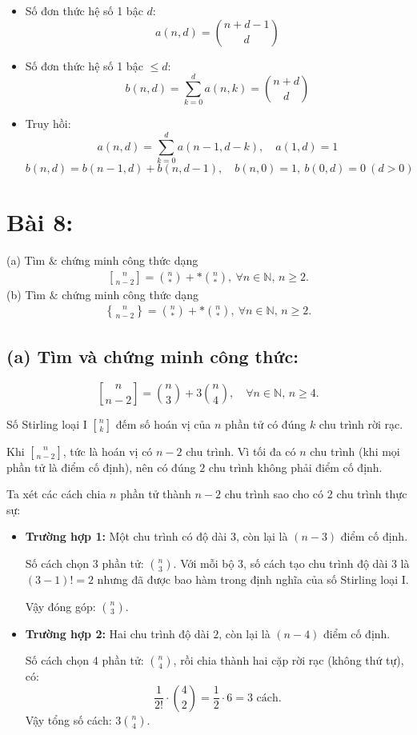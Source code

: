 \documentclass{article}
\newcommand{\stirlingI}[2]{\genfrac{[}{]}{0pt}{}{#1}{#2}}
\newcommand{\stirlingII}[2]{\genfrac{\{}{\}}{0pt}{}{#1}{#2}}
\begin{document}
	\begin{itemize}
		\item Số đơn thức hệ số 1 bậc $d$:
		\[
		a(n,d) = \binom{n + d - 1}{d}
		\]
		\item Số đơn thức hệ số 1 bậc $\le d$:
		\[
		b(n,d) = \sum_{k=0}^d a(n,k) = \binom{n + d}{d}
		\]
		\item Truy hồi:
		\[
		a(n,d) = \sum_{k=0}^d a(n - 1, d - k), \quad a(1,d) = 1
		\]
		\[
		b(n,d) = b(n - 1, d) + b(n, d - 1),\quad b(n,0) = 1,\ b(0,d) = 0\ (d > 0)
		\]
	\end{itemize}
	
	\section*{Bài 8:}
	
	(a) Tìm $\&$ chứng minh công thức dạng
	\begin{align*}
		\stirlingI{n}{n - 2} = \binom{n}{*} + *\binom{n}{*},\ \forall n\in\mathbb{N},\,n\ge2.
	\end{align*}
	(b) Tìm $\&$ chứng minh công thức dạng
	\begin{align*}
		\stirlingII{n}{n - 2} = \binom{n}{*} + *\binom{n}{*},\ \forall n\in\mathbb{N},\,n\ge2.
	\end{align*}
	
	
	\subsection*{(a) Tìm và chứng minh công thức:}
	\[
	\stirlingI{n}{n - 2} = \binom{n}{3} + 3\binom{n}{4},\quad \forall n \in \mathbb{N},\, n \ge 4.
	\]
	
	Số Stirling loại I $\stirlingI{n}{k}$ đếm số hoán vị của $n$ phần tử có đúng $k$ chu trình rời rạc.
	
	Khi $\stirlingI{n}{n-2}$, tức là hoán vị có $n - 2$ chu trình. Vì tối đa có $n$ chu trình (khi mọi phần tử là điểm cố định), nên có đúng $2$ chu trình không phải điểm cố định.
	
	Ta xét các cách chia $n$ phần tử thành $n - 2$ chu trình sao cho có 2 chu trình thực sự:
	
	\begin{itemize}
		\item \textbf{Trường hợp 1:} Một chu trình có độ dài $3$, còn lại là $(n - 3)$ điểm cố định.
		
		Số cách chọn 3 phần tử: $\binom{n}{3}$. Với mỗi bộ 3, số cách tạo chu trình độ dài 3 là $(3-1)! = 2$ nhưng đã được bao hàm trong định nghĩa của số Stirling loại I.
		
		Vậy đóng góp: $\binom{n}{3}$.
		
		\item \textbf{Trường hợp 2:} Hai chu trình độ dài $2$, còn lại là $(n - 4)$ điểm cố định.
		
		Số cách chọn 4 phần tử: $\binom{n}{4}$, rồi chia thành hai cặp rời rạc (không thứ tự), có:
		\[
		\frac{1}{2!} \cdot \binom{4}{2} = \frac{1}{2} \cdot 6 = 3 \text{ cách}.
		\]
		Vậy tổng số cách: $3\binom{n}{4}$.
	\end{itemize}
	
\end{document}
